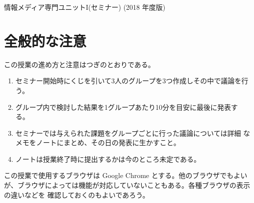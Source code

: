 \documentclass[a4j]{jarticle}
\begin{document}
\begin{center}
 \Large 情報メディア専門ユニットI(セミナー) (2018 年度版)
\end{center}
\section{全般的な注意}
この授業の進め方と注意はつぎのとおりである。
\begin{enumerate}
 \item セミナー開始時にくじを引いて3人のグループを3つ作成しその中で議論を行う。
 \item グループ内で検討した結果を1グループあたり10分を目安に最後に発表する。
 \item セミナーでは与えられた課題をグループごとに行った議論については詳細
			 なメモをノートにまとめ、その日の発表に生かすこと。
 \item ノートは授業終了時に提出するかは今のところ未定である。
\end{enumerate}

この授業で使用するブラウザは Google Chrome とする。他のブラウザでもよい
が、ブラウザによっては機能が対応していないこともある。各種ブラウザの表示の違いなどを
確認しておくのもよいであろう。

\end{document}
